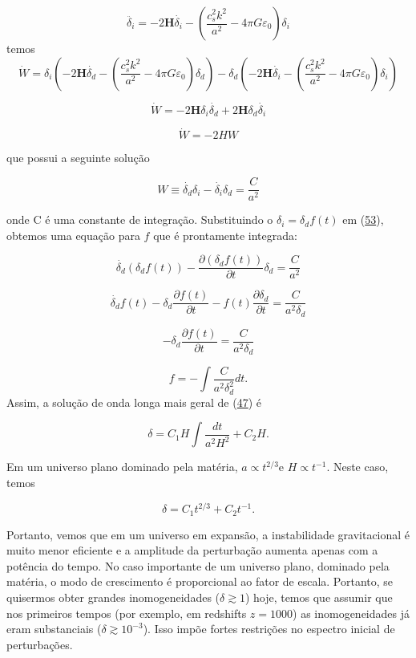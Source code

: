 \documentclass[a4paper,12pt]{article}
\begin{document}
$$\ddot{\delta_i}  = - 2\mathbf{H}\dot{\delta_i} - \left( \dfrac{c^2_s k^2}{a^2} -4\pi G\varepsilon_0\right)\delta_i$$
temos
$$\dot{W}= \delta_i\left(- 2\mathbf{H}\dot{\delta_d} - \left( \dfrac{c^2_s k^2}{a^2} -4\pi G\varepsilon_0\right)\delta_d  \right)-\delta_d\left( - 2\mathbf{H}\dot{\delta_i} - \left( \dfrac{c^2_s k^2}{a^2} -4\pi G\varepsilon_0\right)\delta_i\right)$$

$$\dot{W}=  -2\mathbf{H}\delta_i\dot{\delta_d} +2\mathbf{H}\delta_d \dot{\delta_i} $$

\begin{equation}\label{eq52}
	\dot{W} = -2H W
\end{equation}

que possui a seguinte solução

\begin{equation}\label{eq53}
	W \equiv \dot{\delta_d} \delta_i - \dot{\delta_i} \delta_d = \dfrac{C}{a^2}
\end{equation}

onde C é uma constante de integração. Substituindo o $\delta_i = \delta_d f (t)$ em (\hyperref[eq53]{53}), obtemos uma equação para $f$ que é prontamente integrada:

$$\dot{\delta_d} (\delta_d f(t)) - \dfrac{\partial(\delta_d f(t))}{\partial t} \delta_d = \dfrac{C}{a^2}$$

$$\dot{\delta_d}f(t) - \delta_d\dfrac{\partial f(t)}{\partial t} -f(t)\dfrac{\partial\delta_d }{\partial t}= \dfrac{C}{a^2\delta_d}$$

$$- \delta_d\dfrac{\partial f(t)}{\partial t} = \dfrac{C}{a^2\delta_d}$$

\begin{equation}\label{eq54}
	f = - \int \dfrac{C}{a^2\delta_d^2}dt.
\end{equation}
Assim, a solução de onda longa mais geral de (\hyperref[eq47]{47}) é

\begin{equation}\label{eq55}
	\delta = C_1 H \int \dfrac{dt}{a^2H^2} + C_2 H.
\end{equation}

Em um universo plano dominado pela matéria, $a \propto t^{2/3}$e $H \propto t^{-1}$. Neste caso, temos

\begin{equation}\label{eq56}
	\delta = C_1 t^{2/3} + C_2 t^{-1}.
\end{equation}

Portanto, vemos que em um universo em expansão, a instabilidade gravitacional é muito menor
eficiente e a amplitude da perturbação aumenta apenas com a potência do tempo. No caso importante de um universo plano, dominado pela matéria, o modo de crescimento é proporcional
ao fator de escala. Portanto, se quisermos obter grandes inomogeneidades ($\delta \gtrsim 1$) hoje, temos que assumir que nos primeiros tempos (por exemplo, em redshifts $z = 1000$)
as inomogeneidades já eram substanciais ($\delta \gtrsim 10^{-3}$). Isso impõe fortes
restrições no espectro inicial de perturbações.
\newline
\end{document}
